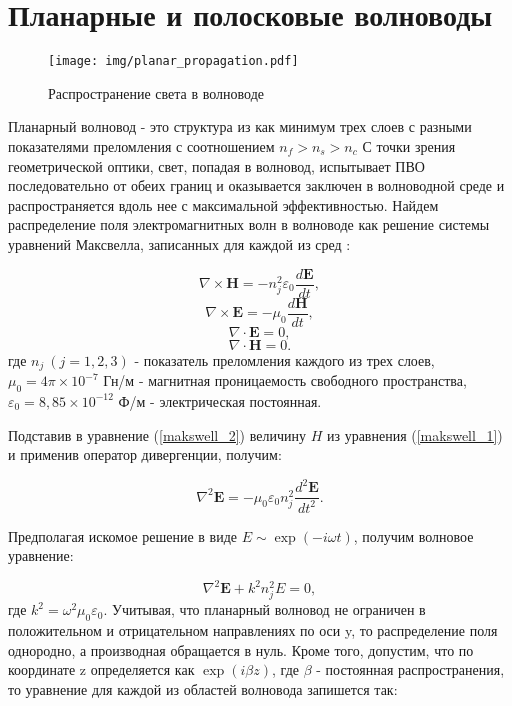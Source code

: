 \section{Планарные и полосковые волноводы}

\begin{figure}[h!]
\texttt{[image: img/planar\_propagation.pdf]}
\caption{Распространение света в волноводе}
\end{figure}
Планарный волновод - это структура из как минимум трех слоев с разными показателями преломления с соотношением $n_f > n_s > n_c$ С точки зрения геометрической оптики, свет, попадая в волновод, испытывает ПВО последовательно от обеих границ и оказывается заключен в волноводной среде и распространяется вдоль нее с максимальной эффективностью. Найдем распределение поля электромагнитных волн в волноводе как решение системы уравнений Максвелла, записанных для каждой из сред \cite{adams}:

\begin{equation}
 	\nabla\times \mathbf{H} = -n_j^2\varepsilon_0 \frac{d\mathbf{E}}{dt},
 	\label{makswell_1}
\end{equation}
\begin{equation}
	\nabla\times \mathbf{E} = -\mu_0\frac{d\mathbf{H}}{dt},
  	\label{makswell_2}
\end{equation}
\begin{equation}
 	\nabla\cdot \mathbf{E} = 0,
 	\label{makswell_3}
\end{equation}
\begin{equation}
 	\nabla\cdot \mathbf{H} = 0.
 	\label{makswell_4} 
\end{equation}
\noindent
где $n_j\ (j = 1,2,3)$ - показатель преломления каждого из трех слоев, $\mu_0 = 4 \pi \times 10^{-7}$ Гн/м - магнитная проницаемость свободного пространства, $\varepsilon_0 = 8,85\times 10^{-12}$ Ф/м - электрическая постоянная.

Подставив в уравнение (\ref{makswell_2}) величину $H$ из уравнения (\ref{makswell_1}) и применив оператор дивергенции, получим:

\begin{equation}
	\nabla^2\mathbf{E} = -\mu_0\varepsilon_0 n_j^2 \frac{d^2\mathbf{E}}{dt^2}.
\end{equation}

Предполагая искомое решение в виде $E \sim \exp(-i\omega t)$, получим волновое уравнение:

\begin{equation}
	\nabla^2\mathbf{E} + k^2 n_j^2 E = 0,
\end{equation}
\noindent
где $k^2 = \omega^2\mu_0 \varepsilon_0$. Учитывая, что планарный волновод не ограничен в положительном и отрицательном направлениях по оси y, то распределение поля однородно, а производная обращается в нуль. Кроме того, допустим, что по координате z определяется как $\exp(i\beta z)$, где $\beta$ - постоянная распространения, то уравнение для каждой из областей волновода запишется так:

